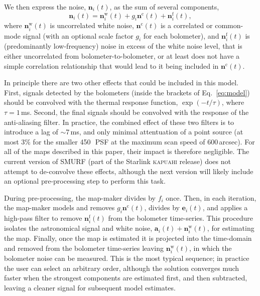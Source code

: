 \documentclass[useAMS,usenatbib,nofootinbib]{mn2e}
\begin{document}
We then express the noise, $\mathbf{n}_i(t)$, as the sum of several
components,
%
\begin{equation}
  \mathbf{n}_i(t) = \mathbf{n}^\mathrm{w}_i(t) +
  g_i\mathbf{n}^\mathrm{c}(t) + \mathbf{n}^\mathrm{f}_i(t),
\label{eq:noise}
\end{equation}
%
where $\mathbf{n}^\mathrm{w}_i(t)$ is uncorrelated white noise,
$\mathbf{n}^\mathrm{c}(t)$ is a correlated or common-mode signal (with
an optional scale factor $g_i$ for each bolometer), and
$\mathbf{n}^\mathrm{f}_i(t)$ is (predominantly low-frequency) noise in
excess of the white noise level, that is either uncorrelated from
bolometer-to-bolometer, or at least does not have a simple correlation
relationship that would lead to it being included in
$\mathbf{n}^\mathrm{c}(t)$.

In principle there are two other effects that could be included in
this model. First, signals detected by the bolometers (inside the
brackets of Eq.~\ref{eq:model}) should be convolved with the thermal
response function, $\exp(-t/\tau)$, where $\tau=1$\,ms. Second, the
final signals should be convolved with the response of the
anti-aliasing filter. In practice, the combined effect of these two
filters is to introduce a lag of $\sim$7\,ms, and only minimal
attentuation of a point source (at most 3\% for the smaller
450\,\micron\ PSF at the maximum scan speed of 600\,arcsec). For all
of the maps described in this paper, their impact is therefore
negligible. The current version of SMURF (part of the Starlink
\textsc{kapuahi} release) does not attempt to de-convolve these
effects, although the next version will likely include an optional
pre-processing step to perform this task.

During pre-processing, the map-maker divides by $f_i$ once. Then, in
each iteration, the map-maker models and removes
$g_i\mathbf{n}^\mathrm{c}(t)$, divides by $\mathbf{e}_i(t)$, and
applies a high-pass filter to remove $\mathbf{n}^\mathrm{f}_i(t)$ from
the bolometer time-series. This procedure isolates the astronomical
signal and white noise, $\mathbf{a}_i(t) +
\mathbf{n}^\mathrm{w}_i(t)$, for estimating the map. Finally, once the
map is estimated it is projected into the time-domain and removed from
the bolometer time-series leaving $\mathbf{n}^\mathrm{w}_i(t)$, in
which the bolometer noise can be measured. This is the most typical
sequence; in practice the user can select an arbitrary order, although
the solution converges much faster when the strongest components are
estimated first, and then subtracted, leaving a cleaner signal for
subsequent model estimates.
\end{document}
